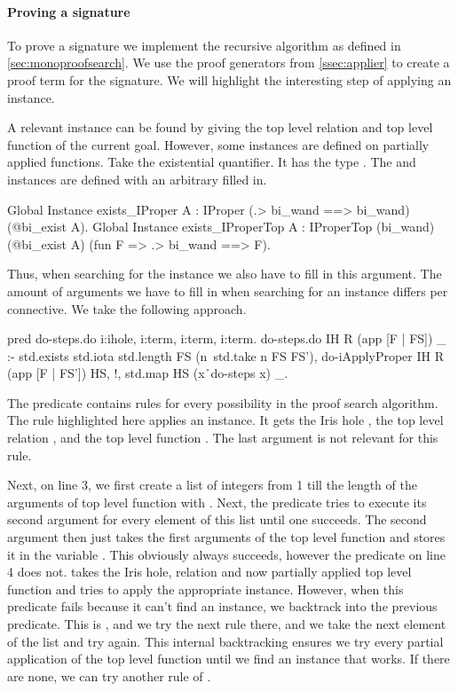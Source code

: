 \documentclass[thesis.tex]{subfiles}
\begin{document}
\paragraph{Proving a signature}
To prove a signature we implement the recursive algorithm as defined in \cref{sec:monoproofsearch}. We use the proof generators from \cref{ssec:applier} to create a proof term for the signature. We will highlight the interesting step of applying an  instance.

A relevant  instance can be found by giving the top level relation and top level function of the current goal. However, some  instances are defined on partially applied functions. Take the existential quantifier. It has the type . The  and  instances are defined with an arbitrary  filled in.
\begin{coqcode}
  Global Instance exists_IProper {A} : 
    IProper (.> bi_wand ==> bi_wand) 
            (@bi_exist A).
  Global Instance exists_IProperTop {A} : 
    IProperTop (bi_wand) (@bi_exist A) 
               (fun F => .> bi_wand ==> F).
\end{coqcode}
Thus, when searching for the instance we also have to fill in this argument. The amount of arguments we have to fill in when searching for an  instance differs per connective. We take the following approach.
\begin{elpicode}
  pred do-steps.do i:ihole, i:term, i:term, i:term.
  do-steps.do IH R (app [F | FS]) _ :- 
    std.exists { std.iota {std.length FS} } 
               (n\ std.take n FS FS'),
    do-iApplyProper IH R (app [F | FS']) HS, !,
    std.map HS (x\r\ do-steps x) _.
\end{elpicode}
The  predicate contains rules for every possibility in the proof search algorithm. The rule highlighted here applies an  instance. It gets the Iris hole , the top level relation , and the top level function . The last argument is not relevant for this rule.

Next, on line 3, we first create a list of integers from 1 till the length of the arguments of top level function with . Next, the  predicate tries to execute its second argument for every element of this list until one succeeds. The second argument then just takes the first  arguments of the top level function and stores it in the variable . This obviously always succeeds, however the predicate on line 4 does not.  takes the Iris hole, relation and now partially applied top level function and tries to apply the appropriate  instance. However, when this predicate fails because it can't find an  instance, we backtrack into the previous predicate. This is , and we try the next rule there, and we take the next element of the list and try again. This internal backtracking ensures we try every partial application of the top level function until we find an  instance that works. If there are none, we can try another rule of .
\end{document}
